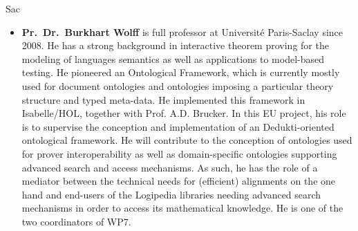 \begin{sitedescription}{Sac}
\begin{itemize}
\item {\bf Pr.\ Dr.\ Burkhart Wolff} is full professor at Université
  Paris-Saclay since 2008. He has a strong background in interactive
  theorem proving for the modeling of languages semantics as well as
  applications to model-based testing. He pioneered an Ontological
  Framework, which is currently mostly used for document ontologies and
  ontologies imposing a particular theory structure and typed meta-data.
  He implemented this framework in Isabelle/HOL, together with Prof.
  A.D. Brucker. In this EU project, his role is to supervise the
  conception and implementation of an Dedukti-oriented ontological
  framework. He will contribute to the conception of ontologies used for
  prover interoperability as well as domain-specific ontologies
  supporting advanced search and access mechanisms. As such, he has the
  role of a mediator between the technical needs for (efficient)
  alignments on the one hand and end-users of the Logipedia libraries
  needing advanced search mechanisms in order to access its mathematical
  knowledge. He is one of the two coordinators of WP7.

\end{itemize}

\end{sitedescription}



